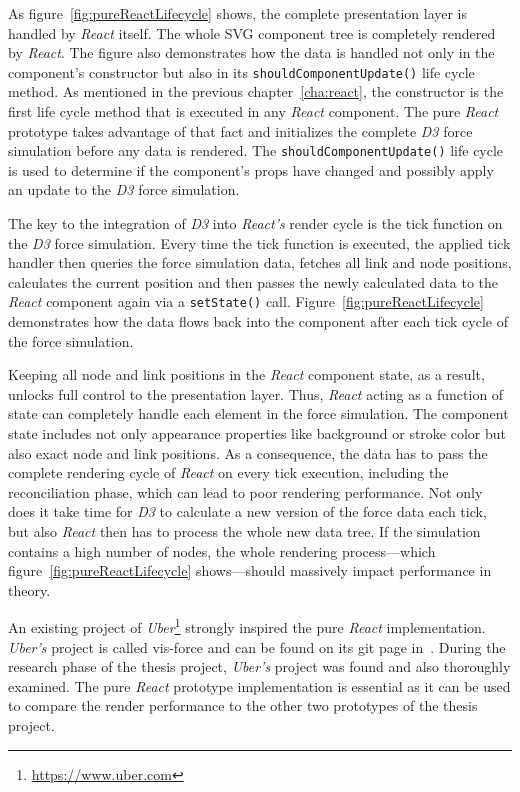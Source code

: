 As figure~\ref{fig:pureReactLifecycle} shows, the complete presentation layer is handled by \emph{React} itself. The whole SVG component tree is completely rendered by \emph{React}. The figure also demonstrates how the data is handled not only in the component's constructor but also in its \texttt{shouldComponentUpdate()} life cycle method. As mentioned in the previous chapter~\ref{cha:react}, the constructor is the first life cycle method that is executed in any \emph{React} component. The pure \emph{React} prototype takes advantage of that fact and initializes the complete \emph{D3} force simulation before any data is rendered. The \texttt{shouldComponentUpdate()} life cycle is used to determine if the component's props have changed and possibly apply an update to the \emph{D3} force simulation.

The key to the integration of \emph{D3} into \emph{React's} render cycle is the tick function on the \emph{D3} force simulation. Every time the tick function is executed, the applied tick handler then queries the force simulation data, fetches all link and node positions, calculates the current position and then passes the newly calculated data to the \emph{React} component again via a \texttt{setState()} call. Figure~\ref{fig:pureReactLifecycle} demonstrates how the data flows back into the component after each tick cycle of the force simulation.

Keeping all node and link positions in the \emph{React} component state, as a result, unlocks full control to the presentation layer. Thus, \emph{React} acting as a function of state can completely handle each element in the force simulation. The component state includes not only appearance properties like background or stroke color but also exact node and link positions. As a consequence, the data has to pass the complete rendering cycle of \emph{React} on every tick execution, including the reconciliation phase, which can lead to poor rendering performance. Not only does it take time for \emph{D3} to calculate a new version of the force data each tick, but also \emph{React} then has to process the whole new data tree. If the simulation contains a high number of nodes, the whole rendering process---which figure~\ref{fig:pureReactLifecycle} shows---should massively impact performance in theory.

An existing project of \emph{Uber}\footnote{\url{https://www.uber.com}} strongly inspired the pure \emph{React} implementation. \emph{Uber's} project is called vis-force and can be found on its git page in~\cite{UberVisForce}. During the research phase of the thesis project, \emph{Uber's} project was found and also thoroughly examined. The pure \emph{React} prototype implementation is essential as it can be used to compare the render performance to the other two prototypes of the thesis project.


